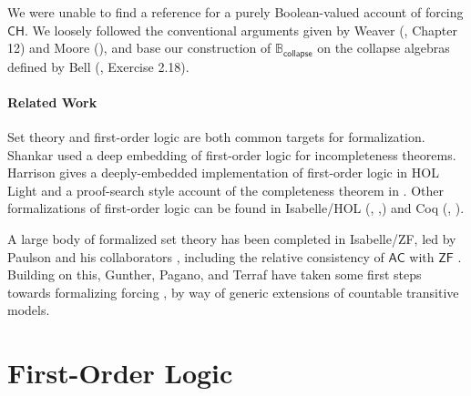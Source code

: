 \documentclass[sigplan,screen]{acmart}
\newcommand{\CH}{\mathsf{CH}}
\theoremstyle{definition}
\begin{document}
We were unable to find a reference for a purely Boolean-valued account of forcing \(\CH\). We loosely followed the conventional arguments given by Weaver (\cite{weaver2014forcing}, Chapter 12) and Moore (\cite{moore2019method}), and base our construction of \(\mathbb{B}_{\mathsf{collapse}}\) on the collapse algebras defined by Bell (\cite{bell2011set}, Exercise 2.18).

\paragraph{Related Work} Set theory and first-order logic are both common targets for formalization. Shankar \cite{shankar1997metamathematics} used a deep embedding of first-order logic for incompleteness theorems. Harrison gives a deeply-embedded implementation of first-order logic in HOL Light \cite{harrison1998formalizing} and a proof-search style account of the completeness theorem in \cite{harrison2009handbook}. Other formalizations of first-order logic can be found in Isabelle/HOL (\cite{Ridge2005AMV}, \cite{schlichtkrull2018formalization},\cite{FOL-Fitting-AFP}) and Coq (\cite{ilik2010constructive}, \cite{DBLP:conf/tphol/OConnor05}).

A large body of formalized set theory has been completed in Isabelle/ZF, led by Paulson and his collaborators \cite{paulson1996mechanizing, paulson1993set, paulson2002reflection}, including the relative consistency of \(\mathsf{AC}\) with $\mathsf{ZF}$ \cite{paulson2008relative}. Building on this, Gunther, Pagano, and Terraf have taken some first steps towards formalizing forcing \cite{gunther2018first, gunther2019mechanization}, by way of generic extensions of countable transitive models.



\section{First-Order Logic}
\label{sect:fol}
\end{document}
